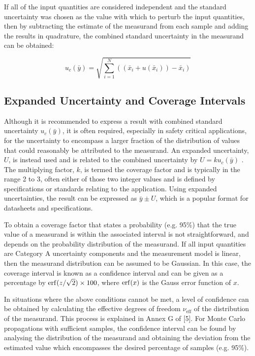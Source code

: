 \documentclass[../thesis/thesis.tex]{subfiles}
\begin{document}
\begin{refsection}
If all of the input quantities are considered independent and the standard uncertainty was chosen as the value with which to perturb the input quantities, then by subtracting the estimate of the measurand from each sample and adding the results in quadrature, the combined standard uncertainty in the measurand can be obtained:

\begin{equation}
u_c(\bar{y}) = \sqrt{\sum_{i=1}^{N}((\bar{x}_i+u(\bar{x}_i))-\bar{x}_i)}
\end{equation}

\subsection{Expanded Uncertainty and Coverage Intervals}

Although it is recommended to express a result with combined standard uncertainty $u_c({\bar{y}})$, it is often required, especially in safety critical applications, for the uncertainty to encompass a larger fraction of the distribution of values that could reasonably be attributed to the measurand. An expanded uncertainty, $U$, is instead used and is related to the combined uncertainty by $U=ku_c(\bar{y})$ \cite[6.2.1]{GUM_2008}. The multiplying factor, $k$, is termed the coverage factor and is typically in the range 2 to 3, often either of those two integer values and is defined by specifications or standards relating to the application.  Using expanded uncertainties, the result can be expressed as $\bar{y} \pm U$, which is a popular format for datasheets and specifications.

To obtain a coverage factor that states a probability (e.g. 95\%) that the true value of a measurand is within the associated interval is not straightforward, and depends on the probability distribution of the measurand. If all input quantities are Category A uncertainty components and the measurement model is linear, then the measurand distribution can be assumed to be Gaussian. In this case, the coverage interval is known as a confidence interval and can be given as a percentage by  $\operatorname{erf}(z/\sqrt{2})\times 100$, where $\operatorname{erf}(x)$ is the Gauss error function of $x$.
 
In situations where the above conditions cannot be met, a level of confidence can be obtained by calculating the effective degrees of freedom $\nu_\text{eff}$ of the distribution of the measurand. This process is explained in Annex G of [5]. For Monte Carlo propagations with sufficient samples, the confidence interval can be found by analysing the distribution of the measurand and obtaining the deviation from the estimated value which encompasses the desired percentage of samples (e.g. 95\%).


\end{refsection}
\end{document}
